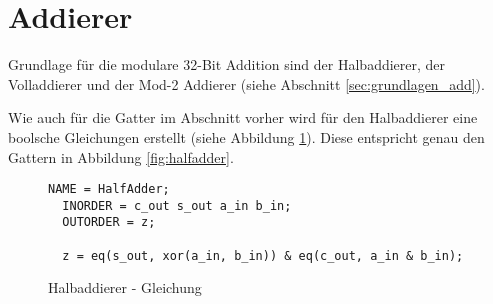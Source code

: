 \section{Addierer}
\label{sec:knf:addierer}

Grundlage für die modulare 32-Bit Addition sind der Halbaddierer, der Volladdierer und der Mod-2 Addierer (siehe Abschnitt \ref{sec:grundlagen_add}).

Wie auch für die Gatter im Abschnitt vorher wird für den Halbaddierer eine boolsche Gleichungen erstellt (siehe Abbildung \ref{fig:halfadder_eqn}).
Diese entspricht genau den Gattern in Abbildung \ref{fig:halfadder}.
\begin{figure}[!h]
  \centering
  \begin{lstlisting}[]
  NAME = HalfAdder;
  INORDER = c_out s_out a_in b_in;
  OUTORDER = z;

  z = eq(s_out, xor(a_in, b_in)) & eq(c_out, a_in & b_in);
  \end{lstlisting}
  \caption{Halbaddierer - Gleichung}
  \label{fig:halfadder_eqn}
\end{figure}

